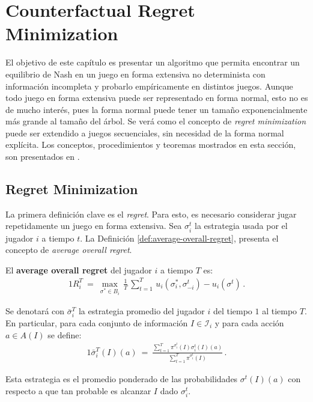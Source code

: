 \chapter{Counterfactual Regret Minimization}
\label{chapter:cfr}

El objetivo de este capítulo es presentar un algoritmo que permita encontrar un equilibrio de Nash en un juego en forma extensiva no determinista con información incompleta y probarlo empíricamente en distintos juegos. Aunque todo juego en forma extensiva puede ser representado en forma normal, esto no es de mucho interés, pues la forma normal puede tener un tamaño exponencialmente más grande al tamaño del árbol. Se verá como el concepto de \textit{regret minimization} puede ser extendido a juegos secuenciales, sin necesidad de la forma normal explícita. Los conceptos, procedimientos y teoremas mostrados en esta sección, son presentados en \cite{bib:cfr}.

\section{Regret Minimization}

La primera definición clave es el \textit{regret}. Para esto, es necesario considerar jugar repetidamente un juego en forma extensiva. Sea $\sigma_i^t$ la estrategia usada por el jugador $i$ a tiempo $t$. La Definición \ref{def:average-overall-regret}, presenta el concepto de \textit{average overall regret}.

\begin{definition}
\label{def:average-overall-regret}
El \textbf{average overall regret} del jugador $i$ a tiempo $T$ es:
\begin{alignat}{1}
R_i^T\ =\ \max_{\sigma^* \in B_i} \, \frac{1}{T}\, \sum_{t = 1}^T \, u_i(\sigma_i^*, \sigma_{-i}^t) - u_i(\sigma^t) \,.
\end{alignat}
\end{definition}

Se denotará con $\bar{\sigma}_i^{T}$ la estrategia promedio del jugador $i$ del tiempo $1$ al tiempo $T$. En particular, para cada conjunto de información $I \in \mathcal{I}_i$ y para cada acción $a \in A(I)$ se define:
\begin{alignat}{1}
\bar{\sigma}_i^{T}(I)(a)\ =\ \frac{\sum_{t = 1}^T \pi^{\sigma^t_i}(I)\sigma^t_i(I)(a)}{\sum_{t = 1}^T \pi^{\sigma_i^t}(I)} \,.
\end{alignat}

Esta estrategia es el promedio ponderado de las probabilidades $\sigma^t(I)(a)$ con respecto a que tan probable es alcanzar $I$ dado $\sigma_i^t$.

